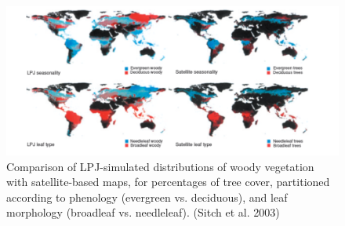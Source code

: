 \documentclass[
  12pt,
  oneside]{book}
\begin{document}
\begin{figure}

{\centering \includegraphics[width=0.8\linewidth]{figures/chap6/f66_LPJ_comparison_sitch} 

}

\caption{Comparison of LPJ-simulated distributions of woody vegetation with satellite-based maps, for percentages of tree cover, partitioned according to phenology (evergreen vs. deciduous), and leaf morphology (broadleaf vs. needleleaf). (Sitch et al. 2003)}\label{fig:f66}
\end{figure}
\end{document}
